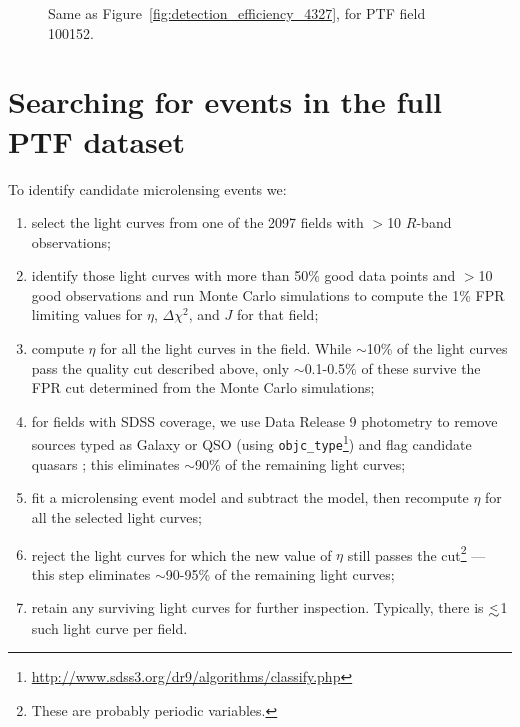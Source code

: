\documentclass{emulateapj}
\newcommand{\lapprox }{{\lower0.8ex\hbox{$\buildrel <\over\sim$}}}
\begin{document}
\begin{figure}
\centering
	
\caption{Same as Figure~\ref{fig:detection_efficiency_4327}, for PTF field 100152.}\label{fig:detection_efficiency_100152}
\end{figure}

\section{Searching for events in the full PTF dataset}\label{sec:search}
To identify candidate microlensing events we: %
\begin{enumerate}
	\item select the light curves from one of the 2097 fields with $>$10 $R$-band observations;
	\item identify those light curves with more than 50\% good data points and $>$10 good observations and run Monte Carlo simulations to compute the 1\% FPR limiting values for $\eta$, $\Delta \chi^2$, and $J$ for that field;
	\item compute $\eta$ for all the light curves in the field. While $\sim$10\% of the light curves pass the quality cut described above, only $\sim$0.1-0.5\% of these survive the FPR cut determined from the Monte Carlo simulations;
	\item for fields with SDSS coverage, we use Data Release 9 photometry \citep{dr9paper} to remove sources typed as Galaxy or QSO (using \texttt{objc\_type}\footnote{\url{http://www.sdss3.org/dr9/algorithms/classify.php}}) and flag candidate quasars \citep[using the cuts described in][]{richards02}; this eliminates $\sim$90\% of the remaining light curves;
	\item fit a microlensing event model and subtract the model, then recompute $\eta$ for all the selected light curves;
	\item reject the light curves for which the new value of $\eta$ still passes the cut\footnote{These are probably periodic variables.} --- this step eliminates $\sim$90-95\% of the remaining light curves;
	\item retain any surviving light curves for further inspection. Typically, there is $\lapprox$1 such light curve per field.
\end{enumerate}
\end{document}
